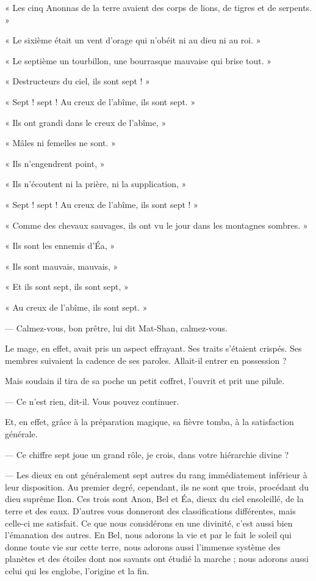 \documentclass[a4paper, 11pt, oneside, polutonikogreek, french]{article}
\begin{document}
« Les cinq Anonnas de la terre avaient des corps de lions, de tigres et de serpents. »

« Le sixième était un vent d'orage qui n'obéit ni au dieu ni au roi. »

« Le septième un tourbillon, une bourrasque mauvaise qui brise tout. »

« Destructeurs du ciel, ils sont sept ! »

« Sept ! sept ! Au creux de l'abîme, ils sont sept. »

« Ils ont grandi dans le creux de l'abîme, »

« Mâles ni femelles ne sont. »

« Ils n'engendrent point, »

« Ils n'écoutent ni la prière, ni la supplication, »

« Sept ! sept ! Au creux de l'abîme, ils sont sept ! »

« Comme des chevaux sauvages, ils ont vu le jour dans les montagnes sombres. »

« Ils sont les ennemis d'Éa, »

« Ils sont mauvais, mauvais, »

« Et ils sont sept, ils sont sept, »

« Au creux de l'abîme, ils sont sept. »

\bigskip
\centerline{\EightStarTaper}
\centerline{\EightStarTaper\EightStarTaper}
\bigskip

--- Calmez-vous, bon prêtre, lui dit Mat-Shan, calmez-vous.

Le mage, en effet, avait pris un aspect effrayant. Ses traits s'étaient crispés. Ses membres suivaient la cadence de ses paroles. Allait-il entrer en possession ?

Mais soudain il tira de sa poche un petit coffret, l'ouvrit et prit une pilule.

--- Ce n'est rien, dit-il. Vous pouvez continuer.

Et, en effet, grâce à la préparation magique, sa fièvre tomba, à la satisfaction générale.

\bigskip
\centerline{\EightStarTaper}
\centerline{\EightStarTaper\EightStarTaper}
\bigskip

--- Ce chiffre sept joue un grand rôle, je crois, dans votre hiérarchie divine ?

--- Les dieux en ont généralement sept autres du rang immédiatement inférieur à leur disposition. Au premier degré, cependant, ils ne sont que trois, procédant du dieu suprême Ilon. Ces trois sont Anon, Bel et Éa, dieux du ciel ensoleillé, de la terre et des eaux. D'autres vous donneront des classifications différentes, mais celle-ci me satisfait. Ce que nous considérons en une divinité, c'est aussi bien l'émanation des autres. En Bel, nous adorons la vie et par le fait le soleil qui donne toute vie sur cette terre, nous adorons aussi l'immense système des planètes et des étoiles dont nos savants ont étudié la marche ; nous adorons aussi celui qui les englobe, l'origine et la fin.
\end{document}
